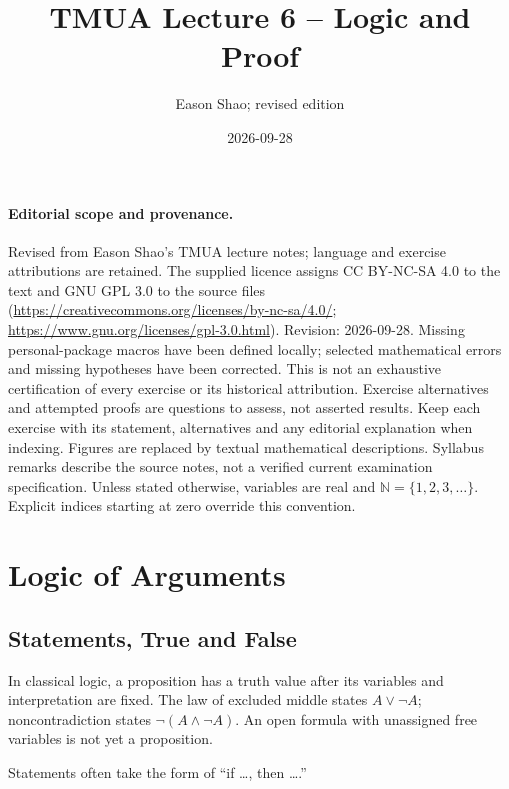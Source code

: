 \documentclass[11pt]{article}
\title{TMUA Lecture 6 -- Logic and Proof}
\author{Eason Shao; revised edition}
\date{2026-09-28}
\theoremstyle{definition}
\theoremstyle{remark}
\newcommand{\NN}{\mathbb{N}}
\begin{document}
\maketitle
\paragraph{Editorial scope and provenance.}
Revised from Eason Shao's TMUA lecture notes; language and exercise attributions are retained.
The supplied licence assigns CC BY-NC-SA 4.0 to the text and GNU GPL 3.0 to the source files
(\url{https://creativecommons.org/licenses/by-nc-sa/4.0/};
\url{https://www.gnu.org/licenses/gpl-3.0.html}).
Revision: 2026-09-28. Missing personal-package macros have been defined locally;
selected mathematical errors and missing hypotheses have been corrected.
This is not an exhaustive certification of every exercise or its historical attribution.
Exercise alternatives and attempted proofs are questions to assess, not asserted results.
Keep each exercise with its statement, alternatives and any editorial explanation when indexing.
Figures are replaced by textual mathematical descriptions. Syllabus remarks describe the
source notes, not a verified current examination specification.
Unless stated otherwise, variables are real and \(\NN=\{1,2,3,\ldots\}\).
Explicit indices starting at zero override this convention.

\tableofcontents


\section{Logic of Arguments}\label{tmua-6-section-001}

\subsection{Statements, True and False}\label{tmua-6-subsection-001}

In classical logic, a proposition has a truth value after its variables and interpretation are fixed. The law of excluded middle states \(A\lor\lnot A\); noncontradiction states \(\lnot(A\land\lnot A)\). An open formula with unassigned free variables is not yet a proposition.

Statements often take the form of ``if \dots, then \dots.''
\end{document}
